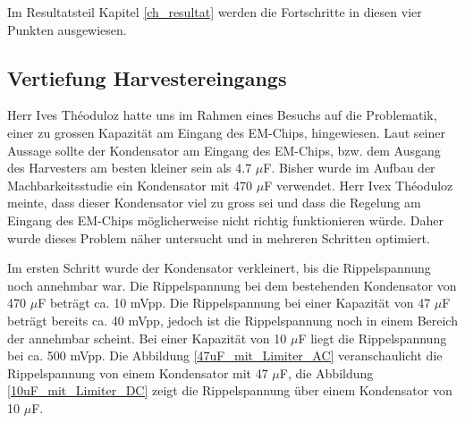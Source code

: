 Im Resultatsteil Kapitel \ref{ch_resultat} werden die Fortschritte in diesen vier Punkten ausgewiesen.

\subsection{Vertiefung Harvestereingangs}\label{auffaellig} 

Herr Ives Théoduloz hatte uns im Rahmen eines Besuchs auf die Problematik, einer zu grossen Kapazität am Eingang des EM-Chips, hingewiesen. Laut seiner Aussage sollte der Kondensator am Eingang des EM-Chips, bzw. dem Ausgang des Harvesters am besten kleiner sein als 4.7 $\mu$F. Bisher wurde im Aufbau der Machbarkeitsstudie ein Kondensator mit 470 $\mu$F verwendet. Herr Ivex Théoduloz meinte, dass dieser Kondensator viel zu gross sei und dass die Regelung am Eingang des EM-Chips möglicherweise nicht richtig funktionieren würde. Daher wurde dieses Problem näher untersucht und in mehreren Schritten optimiert.

Im ersten Schritt wurde der Kondensator verkleinert, bis die Rippelspannung noch annehmbar war. Die Rippelspannung bei dem bestehenden Kondensator von 470 $\mu$F beträgt ca. 10 mVpp. Die Rippelspannung bei einer Kapazität von 47 $\mu$F beträgt bereits ca. 40 mVpp, jedoch ist die Rippelspannung noch in einem Bereich der annehmbar scheint. Bei einer Kapazität von 10 $\mu$F liegt die Rippelspannung bei ca. 500 mVpp. Die Abbildung \ref{47uF_mit_Limiter_AC} veranschaulicht die Rippelspannung von einem Kondensator mit 47 $\mu$F, die Abbildung \ref{10uF_mit_Limiter_DC} zeigt die Rippelspannung über einem Kondensator von 10 $\mu$F.

